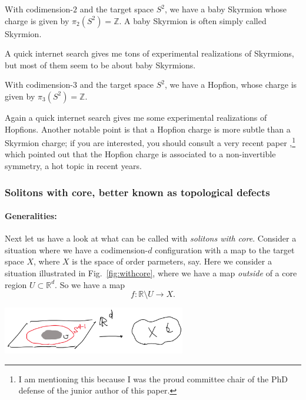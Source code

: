 \documentclass[12pt]{article}
\numberwithin{equation}{section}
\theoremstyle{remark}
\renewenvironment{figure}[1][]{
  \begin{originalfigure}[#1]
    \begin{mdframed}[linecolor=black!0,backgroundcolor=black!1]
}{
    \end{mdframed}
  \end{originalfigure}
}
\def\bR{\mathbb{R}}
\def\bZ{\mathbb{Z}}
\begin{document}
\begin{example}
With codimension-$2$ and the target space $S^2$, we have a baby Skyrmion whose charge is given by $\pi_2(S^2)=\bZ$.
A baby Skyrmion is often simply called  Skyrmion.
\end{example}

A quick internet search gives me tons of experimental realizations of Skyrmions, 
but most of them seem to be about baby Skyrmions. 

\begin{example}
With codimension-$3$ and the target space $S^2$, we have a Hopfion, whose charge is given by $\pi_3(S^2)=\bZ$.
\end{example}

Again a quick internet search gives me some experimental realizations of Hopfions.
Another notable point is that a Hopfion charge is more subtle than a Skyrmion charge;
if you are interested, you should consult a very recent paper \cite{Chen:2022cyw},\footnote{%
I am mentioning this because I was the proud committee chair of the PhD defense of the junior author of this paper.
}
which pointed out that the Hopfion charge is associated to a non-invertible symmetry,
a hot topic in recent years.


\subsubsection{Solitons with core, better known as topological defects}

\paragraph{Generalities:}
Next let us have a look at what can be called with \emph{solitons with core}.
Consider a situation where we have a codimension-$d$ configuration
with a map to the target space $X$, where $X$ is the space of order parmeters, say.
Here we consider a situation illustrated in Fig.~\ref{fig:withcore},
where we have a map \emph{outside} of a core region $U\subset \bR^d$.
So we have a map \begin{equation}
f: \bR\setminus  U \to X.
\end{equation}

\begin{figure}[h]
\centering
  \includegraphics[width=0.6\textwidth]{withcore.png}
  \caption{A codimension-$d$ configuration with `core', given by a map $S^{d-1}\to X$. }
  \label{fig:withcore}
\end{figure}
\end{document}
